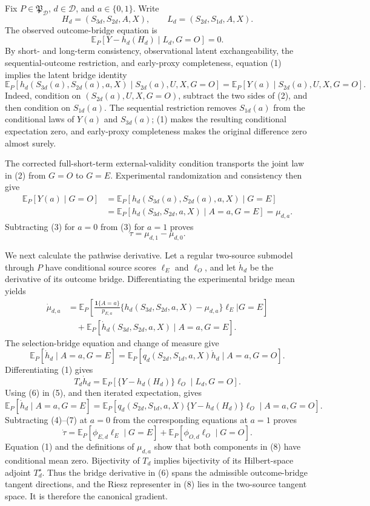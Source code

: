 Fix \(P\in\mathfrak P_{\mathcal D}\), \(d\in\mathcal D\), and \(a\in\{0,1\}\).  Write
\[
 H_d=(S_{3d},S_{2d},A,X),\qquad L_d=(S_{2d},S_{1d},A,X).
\]
The observed outcome-bridge equation is
\[
 \mathbb E_P[Y-h_d(H_d)\mid L_d,G=O]=0. \tag{1}
\]
By short- and long-term consistency, observational latent exchangeability, the sequential-outcome restriction, and early-proxy completeness, equation (1) implies the latent bridge identity
\[
 \mathbb E_P[h_d(S_{3d}(a),S_{2d}(a),a,X)\mid S_{2d}(a),U,X,G=O]
 =\mathbb E_P[Y(a)\mid S_{2d}(a),U,X,G=O]. \tag{2}
\]
Indeed, condition on \((S_{2d}(a),U,X,G=O)\), subtract the two sides of (2), and then condition on \(S_{1d}(a)\).  The sequential restriction removes \(S_{1d}(a)\) from the conditional laws of \(Y(a)\) and \(S_{3d}(a)\); (1) makes the resulting conditional expectation zero, and early-proxy completeness makes the original difference zero almost surely.

The corrected full-short-term external-validity condition transports the joint law in (2) from \(G=O\) to \(G=E\).  Experimental randomization and consistency then give
\[
\begin{aligned}
 \mathbb E_P[Y(a)\mid G=O]
 &=\mathbb E_P[h_d(S_{3d}(a),S_{2d}(a),a,X)\mid G=E]\\
 &=\mathbb E_P[h_d(S_{3d},S_{2d},a,X)\mid A=a,G=E]
 =\mu_{d,a}.
\end{aligned} \tag{3}
\]
Subtracting (3) for \(a=0\) from (3) for \(a=1\) proves
\[
 \tau=\mu_{d,1}-\mu_{d,0}.
\]

We next calculate the pathwise derivative.  Let a regular two-source submodel through \(P\) have conditional source scores \(\ell_E\) and \(\ell_O\), and let \(\dot h_d\) be the derivative of its outcome bridge.  Differentiating the experimental bridge mean yields
\[
\begin{aligned}
 \dot\mu_{d,a}
 &=\mathbb E_P\!\left[
   \frac{\mathbf 1\{A=a\}}{p_{E,a}}
   \{h_d(S_{3d},S_{2d},a,X)-\mu_{d,a}\}\ell_E
   \mathrel{\Big|}G=E\right]\\
 &\quad+\mathbb E_P[\dot h_d(S_{3d},S_{2d},a,X)\mid A=a,G=E].
\end{aligned} \tag{4}
\]
The selection-bridge equation and change of measure give
\[
 \mathbb E_P[\dot h_d\mid A=a,G=E]
 =\mathbb E_P[q_d(S_{2d},S_{1d},a,X)\dot h_d\mid A=a,G=O]. \tag{5}
\]
Differentiating (1) gives
\[
 T_d\dot h_d
 =\mathbb E_P[\{Y-h_d(H_d)\}\ell_O\mid L_d,G=O]. \tag{6}
\]
Using (6) in (5), and then iterated expectation, gives
\[
 \mathbb E_P[\dot h_d\mid A=a,G=E]
 =\mathbb E_P[q_d(S_{2d},S_{1d},a,X)\{Y-h_d(H_d)\}\ell_O
   \mid A=a,G=O]. \tag{7}
\]
Subtracting (4)--(7) at \(a=0\) from the corresponding equations at \(a=1\) proves
\[
 \dot\tau
 =\mathbb E_P[\phi_{E,d}\ell_E\mid G=E]
  +\mathbb E_P[\phi_{O,d}\ell_O\mid G=O]. \tag{8}
\]
Equation (1) and the definitions of \(\mu_{d,a}\) show that both components in (8) have conditional mean zero.  Bijectivity of \(T_d\) implies bijectivity of its Hilbert-space adjoint \(T_d^\star\).  Thus the bridge derivative in (6) spans the admissible outcome-bridge tangent directions, and the Riesz representer in (8) lies in the two-source tangent space.  It is therefore the canonical gradient.

